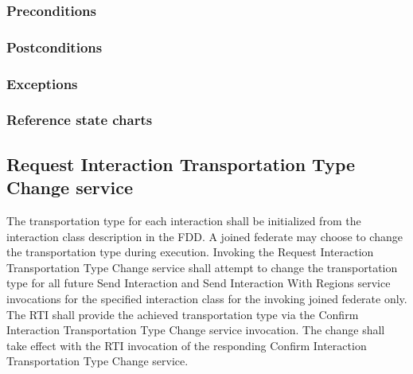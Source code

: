 \begin{compactstdpage}

    \subsubsection{Preconditions}



    \subsubsection{Postconditions}



    \subsubsection{Exceptions}



    \subsubsection{Reference state charts}



    \subsection{Request Interaction Transportation Type Change service}


    The transportation type for each interaction shall be initialized from the interaction class description in the FDD. A joined federate may choose to change the transportation type during execution. Invoking the Request Interaction Transportation Type Change service shall attempt to change the transportation type for all future Send Interaction and Send Interaction With Regions service invocations for the specified interaction class for the invoking joined federate only. The RTI shall provide the achieved transportation type via the Confirm Interaction Transportation Type Change \rtiinitiated{} service invocation. The change shall take effect with the RTI invocation of the responding Confirm Interaction Transportation Type Change \rtiinitiated{} service.


\end{compactstdpage}
